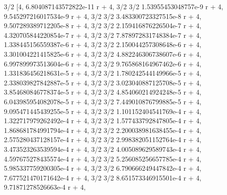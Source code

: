 \documentclass[12pt,arial,letterpaper]{book}
\begin{document}
\begin{eulercomment}
\begin{eulercomment}
\begin{eulercomment}
\begin{eulercomment}
\begin{eulercomment}
\begin{eulercomment}
\begin{eulercomment}
\begin{eulercomment}
\begin{eulercomment}
\begin{eulercomment}
\begin{eulercomment}
\begin{eulercomment}
\begin{eulercomment}
\begin{eulercomment}
\begin{eulercomment}
\begin{eulercomment}
\begin{eulercomment}
\begin{eulercomment}
\begin{eulercomment}
\begin{eulercomment}
\begin{eulercomment}
\begin{eulercomment}
\begin{euleroutput}
                                     3/2
          [4, 6.804087143572822e-11 r    + 4, 
                       3/2                            3/2
  1.53955453048757e-9 r    + 4, 9.545297216017534e-9 r    + 4, 
                        3/2                            3/2
  3.483300723327515e-8 r    + 4, 9.507289389712205e-8 r    + 4, 
                        3/2                            3/2
  2.159416876226504e-7 r    + 4, 4.320705844220854e-7 r    + 4, 
                        3/2                            3/2
  7.878972831748384e-7 r    + 4, 1.338445156559387e-6 r    + 4, 
                        3/2                            3/2
  2.150044257308648e-6 r    + 4, 3.301004221415825e-6 r    + 4, 
                        3/2                            3/2
  4.882246306738607e-6 r    + 4, 6.997899973513604e-6 r    + 4, 
                        3/2                            3/2
  9.765868164967462e-6 r    + 4, 1.331836456218631e-5 r    + 4, 
                        3/2                            3/2
  1.780242544149966e-5 r    + 4, 2.338039827842887e-5 r    + 4, 
                        3/2                            3/2
  3.023040887125708e-5 r    + 4, 3.854680846778374e-5 r    + 4, 
                        3/2                            3/2
  4.854060214924248e-5 r    + 4, 6.043985954082078e-5 r    + 4, 
                        3/2                            3/2
  7.449010876799885e-5 r    + 4, 9.095471445439255e-5 r    + 4, 
                        3/2                            3/2
  1.101152404541769e-4 r    + 4, 1.322717979262492e-4 r    + 4, 
                        3/2                            3/2
  1.577433792847805e-4 r    + 4, 1.868681784991794e-4 r    + 4, 
                        3/2                            3/2
  2.200038981638455e-4 r    + 4, 2.575280437128157e-4 r    + 4, 
                        3/2                            3/2
  2.998382051152764e-4 r    + 4, 3.473523263539594e-4 r    + 4, 
                        3/2                            3/2
  4.005089629589743e-4 r    + 4, 4.597675278435574e-4 r    + 4, 
                        3/2                            3/2
  5.256085256657785e-4 r    + 4, 5.985337759200305e-4 r    + 4, 
                        3/2                            3/2
  6.790666249447842e-4 r    + 4, 7.677521470171642e-4 r    + 4, 
                        3/2                           3/2
  8.651573346915501e-4 r    + 4, 9.71871278526663e-4 r    + 4, 

\end{euleroutput}
\end{eulercomment}
\end{eulercomment}
\end{eulercomment}
\end{eulercomment}
\end{eulercomment}
\end{eulercomment}
\end{eulercomment}
\end{eulercomment}
\end{eulercomment}
\end{eulercomment}
\end{eulercomment}
\end{eulercomment}
\end{eulercomment}
\end{eulercomment}
\end{eulercomment}
\end{eulercomment}
\end{eulercomment}
\end{eulercomment}
\end{eulercomment}
\end{eulercomment}
\end{eulercomment}
\end{eulercomment}
\end{document}

